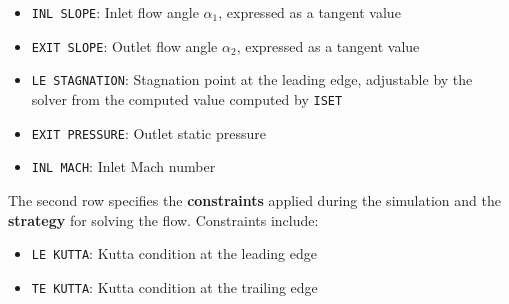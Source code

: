 


\begin{itemize}
    \item \texttt{INL SLOPE}: Inlet flow angle $\alpha_1$, expressed as a tangent value
    \item \texttt{EXIT SLOPE}: Outlet flow angle $\alpha_2$, expressed as a tangent value
    \item \texttt{LE STAGNATION}: Stagnation point at the leading edge, adjustable by the solver from the computed value computed by \texttt{ISET}
    \item \texttt{EXIT PRESSURE}: Outlet static pressure
    \item \texttt{INL MACH}: Inlet Mach number
\end{itemize}

The second row specifies the \textbf{constraints} applied during the simulation and the \textbf{strategy} for solving the flow. Constraints include:

\begin{itemize}
    \item \texttt{LE KUTTA}: Kutta condition at the leading edge
    \item \texttt{TE KUTTA}: Kutta condition at the trailing edge
\end{itemize}

